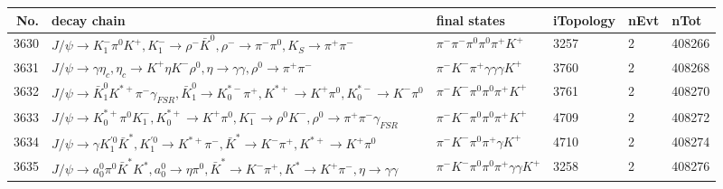 \begin{table}[htbp] 
\begin{center}
\begin{small}
\begin{tabular}{rlllll}\hline\hline
 No. & decay chain & final states &  iTopology & nEvt & nTot \\\hline
3630&$J/\psi       \rightarrow K_{1}^{-}      \pi^{0}        K^{+}          , K_{1}^{-}       \rightarrow \rho^{-}      \bar{K}^{0}   , \rho^{-}       \rightarrow \pi^{-}        \pi^{0}        , K_{S}           \rightarrow \pi^{+}        \pi^{-}        $&$\pi^{-}        \pi^{-}        \pi^{0}        \pi^{0}        \pi^{+}        K^{+}          $& 3257&    2&408266\\
3631&$J/\psi       \rightarrow \gamma       \eta_{c}    , \eta_{c}     \rightarrow K^{+}          \eta          K^{-}          \rho^{0}      , \eta           \rightarrow \gamma       \gamma       , \rho^{0}       \rightarrow \pi^{+}        \pi^{-}        $&$\pi^{-}        K^{-}          \pi^{+}        \gamma       \gamma       \gamma       K^{+}          $& 3760&    2&408268\\
3632&$J/\psi       \rightarrow \bar{K}_1^{0} K^{*+}         \pi^{-}        \gamma_{FSR} , \bar{K}_1^{0}  \rightarrow K_{0}^{*-}     \pi^{+}        , K^{*+}          \rightarrow K^{+}          \pi^{0}        , K_{0}^{*-}      \rightarrow K^{-}          \pi^{0}        $&$\pi^{-}        K^{-}          \pi^{0}        \pi^{0}        \pi^{+}        K^{+}          $& 3761&    2&408270\\
3633&$J/\psi       \rightarrow K_{0}^{*+}     \pi^{0}        K_{1}^{-}      , K_{0}^{*+}      \rightarrow K^{+}          \pi^{0}        , K_{1}^{-}       \rightarrow \rho^{0}      K^{-}          , \rho^{0}       \rightarrow \pi^{+}        \pi^{-}        \gamma_{FSR} $&$\pi^{-}        K^{-}          \pi^{0}        \pi^{0}        \pi^{+}        K^{+}          $& 4709&    2&408272\\
3634&$J/\psi       \rightarrow \gamma       K_1^{'0}      \bar{K}^{*}   , K_1^{'0}       \rightarrow K^{*+}         \pi^{-}        , \bar{K}^{*}    \rightarrow K^{-}          \pi^{+}        , K^{*+}          \rightarrow K^{+}          \pi^{0}        $&$\pi^{-}        K^{-}          \pi^{0}        \pi^{+}        \gamma       K^{+}          $& 4710&    2&408274\\
3635&$J/\psi       \rightarrow a_{0}^{0}      \pi^{0}        \bar{K}^{*}   K^{*}          , a_{0}^{0}       \rightarrow \eta          \pi^{0}        , \bar{K}^{*}    \rightarrow K^{-}          \pi^{+}        , K^{*}           \rightarrow K^{+}          \pi^{-}        , \eta           \rightarrow \gamma       \gamma       $&$\pi^{-}        K^{-}          \pi^{0}        \pi^{0}        \pi^{+}        \gamma       \gamma       K^{+}          $& 3258&    2&408276\\

\end{tabular}
\end{small}
\end{center}
\end{table}
